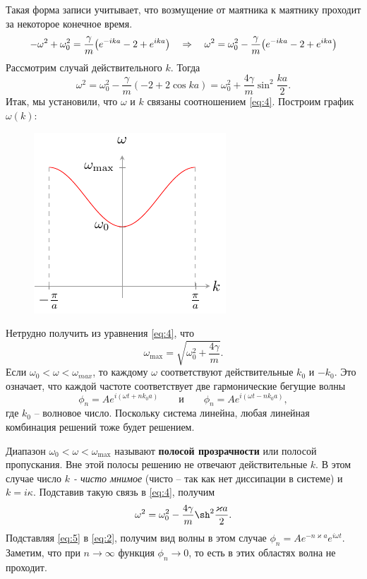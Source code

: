 Такая форма записи учитывает, что возмущение от маятника к маятнику проходит за некоторое конечное время.
\begin{equation}
	-\omega^2+\omega_0^2=\frac{\gamma}{m}\qty(e^{-ika}-2+e^{ika})
	\quad \Rightarrow \quad
	\omega^2=\omega_0^2-\frac{\gamma}{m}\qty(e^{-ika}-2+e^{ika})
	\label{eq:3}
\end{equation}
Рассмотрим случай  действительного $k$. Тогда
\begin{equation}
	\omega^2=\omega_0^2-\frac{\gamma}{m}(-2+2\cos{ka})=\omega_0^2+\frac{4\gamma}{m}\sin^2{\frac{ka}{2}}.
	\label{eq:4}
\end{equation}
Итак, мы установили, что $\omega$ и $k$ связаны соотношением \eqref{eq:4}. Построим график $\omega(k)$:
\begin{figure}[H]
	\centering
	\includegraphics[scale=1.5]{img/osci_and_wave_in_ordered_struct/disp_of_struct}
\end{figure}
Нетрудно получить из уравнения \eqref{eq:4}, что 
\begin{equation*}
	\omega_{\max}=\sqrt{\omega_0^2+\frac{4\gamma}{m}}.
\end{equation*}
Если $\omega_0 < \omega < \omega_{max}$, то каждому $\omega$ соответствуют действительные $k_0$ и $-k_0$. Это означает, что каждой частоте соответствует две гармонические бегущие волны
\begin{equation*}
	\phi_n=A e^{i(\omega t+nk_0a)} 
	\qquad\text{и}\qquad
	\phi_n=A e^{i(\omega t-nk_0a)},
\end{equation*}
где $k_0$ -- волновое число. Поскольку система линейна, любая линейная комбинация решений тоже будет решением. 

Диапазон $\omega_0 < \omega < \omega_{\max}$ называют \textbf{полосой прозрачности} или полосой пропускания. Вне этой полосы решению не отвечают действительные $k$. В этом случае число \textit{$k$ - чисто мнимое} (чисто -- так как нет диссипации в системе) и $k=i\kappa$. Подставив такую связь в \eqref{eq:4}, получим
\begin{equation}
	\omega^2=\omega_0^2-\frac{4\gamma}{m}\sh^2{\frac{\varkappa a}{2}}.
	\label{eq:5}
\end{equation}
Подставляя \eqref{eq:5} в \eqref{eq:2}, получим вид волны в этом случае $\phi_n=A e^{-n\varkappa a} e^{i\omega t}$. Заметим, что при $n\rightarrow \infty$ функция  $\phi_n \rightarrow 0$, то есть в этих областях волна не проходит. 

